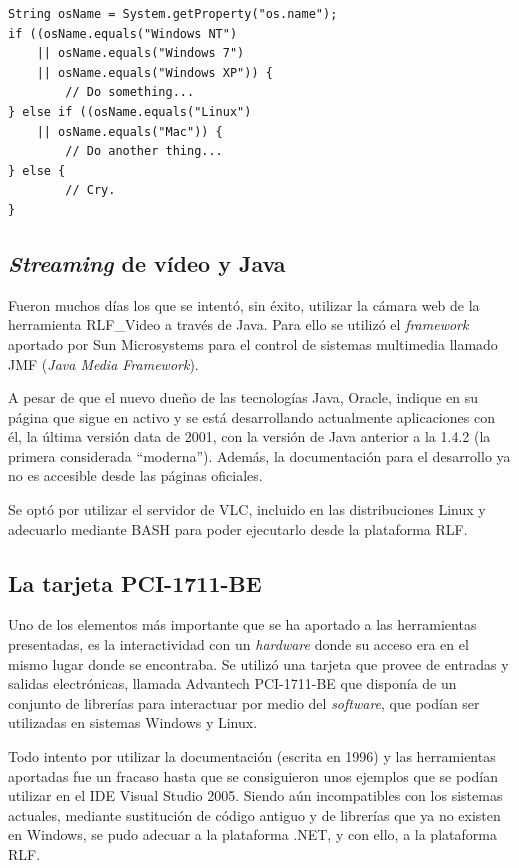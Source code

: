 \begin{verbatim}
String osName = System.getProperty("os.name");
if ((osName.equals("Windows NT") 
    || osName.equals("Windows 7")
    || osName.equals("Windows XP")) {
        // Do something...
} else if ((osName.equals("Linux")
    || osName.equals("Mac")) {
        // Do another thing...
} else {
        // Cry.
}
\end{verbatim}

\subsection{\emph{Streaming} de vídeo y Java}
Fueron muchos días los que se intentó, sin éxito, utilizar la 
cámara web de la herramienta RLF\_Video a través de Java. Para ello 
se utilizó el \emph{framework} aportado por Sun Microsystems para el 
control de sistemas multimedia llamado JMF (\emph{Java Media 
Framework}).

A pesar de que el nuevo dueño de las tecnologías Java, Oracle, 
indique en su página que sigue en activo y se está desarrollando 
actualmente aplicaciones con él, la última versión data de 2001, con 
la versión de Java anterior a la 1.4.2 (la primera considerada 
``moderna''). Además, la documentación para el desarrollo ya no es 
accesible desde las páginas oficiales.

Se optó por utilizar el servidor de VLC, incluido en las 
distribuciones Linux y adecuarlo mediante BASH para poder ejecutarlo 
desde la plataforma RLF.

\subsection{La tarjeta PCI-1711-BE}
Uno de los elementos más importante que se ha aportado a las 
herramientas presentadas, es la interactividad con un \emph{hardware} 
donde su acceso era en el mismo lugar donde se encontraba. Se utilizó 
una tarjeta que provee de entradas y salidas electrónicas, llamada 
Advantech PCI-1711-BE que disponía de un conjunto de librerías para 
interactuar por medio del \emph{software}, que podían ser utilizadas 
en sistemas Windows y Linux.

Todo intento por utilizar la documentación (escrita en 1996) y las 
herramientas aportadas fue un fracaso hasta que se consiguieron unos 
ejemplos que se podían utilizar en el IDE Visual Studio 2005. Siendo 
aún incompatibles con los sistemas actuales, mediante sustitución de 
código antiguo y de librerías que ya no existen en Windows, se pudo 
adecuar a la plataforma .NET, y con ello, a la plataforma RLF.

